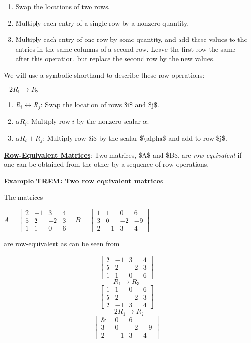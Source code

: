 \documentclass[openany]{book}
\providecommand{\tightlist}{%
  \setlength{\itemsep}{0pt}\setlength{\parskip}{0pt}}
\begin{document}
\begin{enumerate}
\def\labelenumi{\arabic{enumi}.}
\tightlist
\item
  Swap the locations of two rows.
\item
  Multiply each entry of a single row by a nonzero quantity.
\item
  Multiply each entry of one row by some quantity, and add these values
  to the entries in the same columns of a second row. Leave the first
  row the same after this operation, but replace the second row by the
  new values.
\end{enumerate}

We will use a symbolic shorthand to describe these row operations:

\({-2}R_{1} \rightarrow R_{2}\)

\begin{enumerate}
\def\labelenumi{\arabic{enumi}.}
\tightlist
\item
  \(R_{i} \leftrightarrow R_{j}\): Swap the location of rows \$i\$ and
  \$j\$.
\item
  \(\alpha R_{i}\): Multiply row \(i\) by the nonzero scalar \(\alpha\).
\item
  \(\alpha R_{i} + R_{j}\): Multiply row \$i\$ by the scalar
  \$\textbackslash{}alpha\$ and add to row \$j\$.
\end{enumerate}

\protect\hyperlink{definition-rem-row-equivalent-matrices}{\textbf{Row-Equivalent
Matrices}}: Two matrices, \$A\$ and \$B\$, are \emph{row-equivalent} if
one can be obtained from the other by a sequence of row operations.

\protect\hyperlink{example-TREM}{\textbf{Example TREM: Two
row-equivalent matrices}}

The matrices

\(A=\begin{bmatrix} 2&-1&3&4\\ 5&2&-2&3\\ 1&1&0&6 \end{bmatrix}\)
\(B=\begin{bmatrix}  1&1&0&6\\  3&0&-2&-9\\  2&-1&3&4  \end{bmatrix}\)

are row-equivalent as can be seen from

\[\begin{bmatrix}
2&-1&3&4\\
5&2&-2&3\\
1&1&0&6
\end{bmatrix}\] \[R_{1} \rightarrow R_{3}\] \[\begin{bmatrix}
1&1&0&6\\
5&2&-2&3\\
2&-1&3&4
\end{bmatrix}\] \[{-2}R_{1} \rightarrow R_{2}\] \[\begin{bmatrix}
\&1&0&6\\
3&0&-2&-9\\
2&-1&3&4
\end{bmatrix}\]
\end{document}
